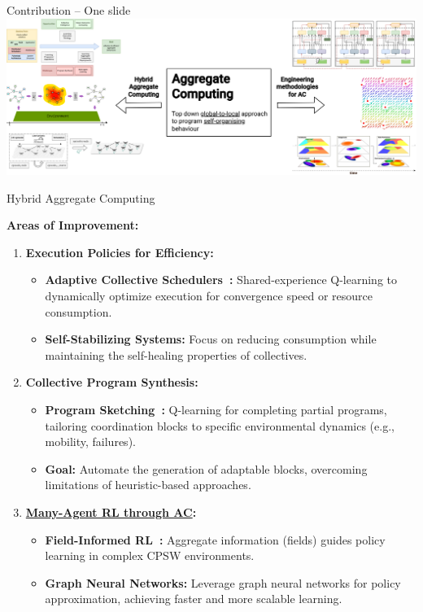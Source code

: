 \documentclass[presentation, 9pt,169]{beamer}\mode<presentation>{\usetheme{AMSBolognaFC}}
\begin{document}
\begin{frame}{Contribution -- One slide}
\\[0.5cm]

\includegraphics[width=\textwidth]{img/contribution.drawio.png}
\end{frame}
\begin{frame}{Hybrid Aggregate Computing}

  \textbf{Areas of Improvement:}
  
  \begin{enumerate}
  \item \textbf{Execution Policies for Efficiency:}
      \begin{itemize}
      \item \textbf{Adaptive Collective Schedulers~\cite{DBLP:conf/acsos/AguzziCV22}:} Shared-experience Q-learning to dynamically optimize execution for convergence speed or resource consumption.
      \item \textbf{Self-Stabilizing Systems:} Focus on reducing consumption while maintaining the self-healing properties of collectives.
      \end{itemize}
  \item \textbf{Collective Program Synthesis:}
      \begin{itemize}
      \item \textbf{Program Sketching~\cite{DBLP:conf/coordination/AguzziCV22}:} Q-learning for completing partial programs, tailoring coordination blocks to specific environmental dynamics (e.g., mobility, failures).
      \item \textbf{Goal:} Automate the generation of adaptable blocks, overcoming limitations of heuristic-based approaches.
      \end{itemize}
  \item \textbf{\underline{Many-Agent RL through AC}:}
      \begin{itemize}
      \item \textbf{Field-Informed RL~\cite{acgnn}:} Aggregate information (fields) guides policy learning in complex CPSW environments.
      \item \textbf{Graph Neural Networks:} Leverage graph neural networks for policy approximation, achieving faster and more scalable learning.
      \end{itemize}
  \end{enumerate}
  
\end{frame}
\end{document}
